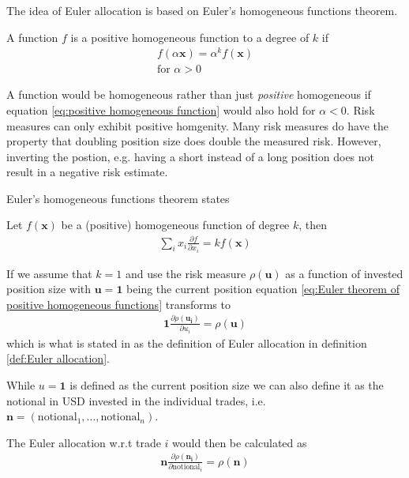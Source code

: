 \documentclass[../Thesis_AHoecherl.tex]{subfiles}
\begin{document}
The idea of Euler allocation is based on Euler's homogeneous functions theorem. 

\begin{definition}
    A function $f$ is a positive homogeneous function to a degree of $k$ if 
    \begin{align} \label{eq:positive homogeneous function}
        f\left(\alpha \mathbf{x}\right) = \alpha^k f\left(\mathbf{x}\right) \\
        \text{for } \alpha >0
    \end{align}
\end{definition}

A function would be homogeneous rather than just \emph{positive} homogeneous if equation \ref{eq:positive homogeneous function} would also hold for $\alpha < 0$.
Risk measures can only exhibit positive homgenity. Many risk measures do have the property that doubling position size does double the measured risk. 
However, inverting the postion, e.g. having a short instead of a long position does not result in a negative risk estimate. 

Euler's homogeneous functions theorem states
\begin{theorem}
    Let $f\left(\mathbf{x}\right)$ be a (positive) homogeneous function of degree $k$, then
    \begin{align}
        \sum_i{x_i \frac{\partial f}{\partial x_i}} = k f(\mathbf{x})
        \label{eq:Euler theorem of positive homogeneous functions}
    \end{align}
\end{theorem}

If we assume that $k=1$ and use the risk measure $\rho(\mathbf{u})$ as a function of invested position size with $\mathbf{u} = \mathbf{1}$ being the current position equation \ref{eq:Euler theorem of positive homogeneous functions} transforms to
\begin{align}
    \mathbf{1}\frac{\partial \rho(\mathbf{u_i})}{\partial u_i} = \rho(\mathbf{u})
    \label{eq:relative bump euler allocation}
\end{align}
which is what is stated in as the definition of Euler allocation in definition \ref{def:Euler allocation}.

While $u = \mathbf{1}$ is defined as the current position size we can also define it as the notional in USD invested in the individual trades, i.e. $\mathbf{n} = (\text{notional}_1, \dots, \text{notional}_n)$.

The Euler allocation w.r.t trade $i$ would then be calculated as
\begin{align}
    \mathbf{n}\frac{\partial \rho(\mathbf{n_i})}{\partial \text{notional}_i} = \rho(\mathbf{n})
    \label{eq:notional based euler allocation}
\end{align}
\end{document}
